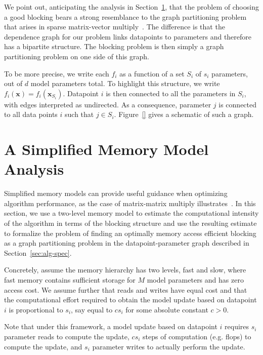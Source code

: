 \documentclass[times,11pt]{article}
\numberwithin{equation}{section}		%
\numberwithin{figure}{section}			%
\numberwithin{table}{section}				%
\newcommand{\xvec}{\mathbf{x}}
\begin{document}
We point out, anticipating the analysis in Section~\ref{sec:memory-model}, that the problem of choosing a good blocking bears a strong resemblance to the graph partitioning problem that arises in sparse matrix-vector multiply~\citep{}. The difference is that the dependence graph for our problem
links datapoints to parameters and therefore has a bipartite structure. The blocking problem is then simply a graph partitioning problem on one side of this graph. 

To be more precise, we write each $f_{i}$ as a function of a set $S_{i}$ of $s_{i}$ parameters, out of $d$ model parameters total. To highlight this structure, we write $f_{i}\left(\xvec\right) = f_{i}\left(\xvec_{S_i}\right)$. Datapoint $i$ is then connected to all the parameters in $S_{i}$,
with edges interpreted as undirected. As a consequence, parameter $j$ is connected to all data points $i$ such that $j \in S_{i}$. Figure~\ref{} gives a schematic of such a graph.

\section{A Simplified Memory Model Analysis}\label{sec:memory-model}

Simplified memory models can provide useful guidance when optimizing algorithm performance, as the case of matrix-matrix multiply illustrates~\citep{}. In this section, we use a two-level memory model to estimate the computational intensity of the algorithm
in terms of the blocking structure and use the resulting estimate to formalize the problem of finding an optimally memory access efficient blocking as a graph partitioning problem in the datapoint-parameter graph described in Section~\ref{sec:alg-spec}.

Concretely, assume the memory hierarchy has two levels, fast and slow, where fast memory contains sufficient storage for $M$ model parameters and has zero access cost. We assume further that reads and writes have equal cost and that the computational effort required to obtain the model update based on datapoint $i$ is proportional to $s_{i}$, say equal to $cs_{i}$ for some absolute constant $c > 0$. 

Note that under this framework, a model update based on datapoint $i$ requires $s_{i}$ parameter reads to compute the update, $cs_{i}$ steps of computation (e.g. flops) to compute the update, and $s_{i}$ parameter writes to actually perform the update. 
\end{document}
